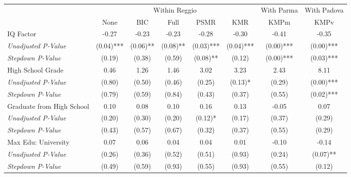 \begin{tabular}{l c c c c c c c}
\toprule
& \multicolumn{5}{c}{Within Reggio} & With Parma & With Padova \\\cmidrule(lr){2-6} \cmidrule(lr){7-7} \cmidrule(lr){8-8}
 & None & BIC & Full & PSMR & KMR & KMPm & KMPv \\
\midrule
IQ Factor & -0.27 & -0.23 & -0.23 & -0.28 & -0.30 & -0.41 & -0.35 \\
\quad \textit{Unadjusted P-Value} & (0.04)*** & (0.06)** & (0.08)** & (0.03)*** & (0.04)*** & (0.00)*** & (0.00)*** \\
\quad \textit{Stepdown P-Value} & (0.19) & (0.38) & (0.59) & (0.08)** & (0.12) & (0.00)*** & (0.03)*** \\
High School Grade & 0.46 & 1.26 & 1.46 & 3.02 & 3.23 & 2.43 & 8.11 \\
\quad \textit{Unadjusted P-Value} & (0.80) & (0.50) & (0.46) & (0.25) & (0.13)* & (0.29) & (0.00)*** \\
\quad \textit{Stepdown P-Value} & (0.79) & (0.59) & (0.84) & (0.43) & (0.37) & (0.55) & (0.02)*** \\
Graduate from High School & 0.10 & 0.08 & 0.10 & 0.16 & 0.13 & -0.05 & 0.07 \\
\quad \textit{Unadjusted P-Value} & (0.20) & (0.30) & (0.20) & (0.12)* & (0.17) & (0.37) & (0.29) \\
\quad \textit{Stepdown P-Value} & (0.43) & (0.57) & (0.67) & (0.32) & (0.37) & (0.55) & (0.29) \\
Max Edu: University & 0.07 & 0.06 & 0.04 & 0.04 & 0.01 & -0.10 & -0.14 \\
\quad \textit{Unadjusted P-Value} & (0.26) & (0.36) & (0.52) & (0.51) & (0.93) & (0.24) & (0.07)** \\
\quad \textit{Stepdown P-Value} & (0.49) & (0.59) & (0.93) & (0.55) & (0.93) & (0.55) & (0.12) \\
\bottomrule
\end{tabular}
